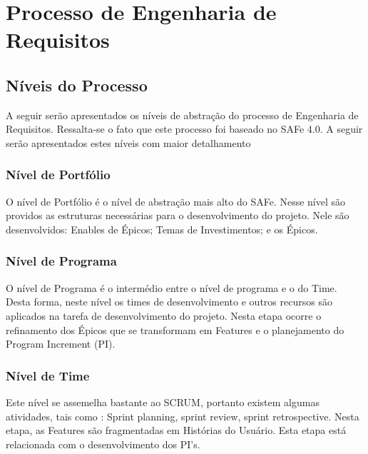 
\chapter[Processo de Engenharia de Requisitos]{Processo de Engenharia de Requisitos}

{
	\large{\section {Níveis do Processo\\} }

	\tab A seguir serão apresentados os níveis de abstração do processo de Engenharia de Requisitos. Ressalta-se o fato que este processo foi baseado no SAFe 4.0. A seguir serão apresentados estes níveis com maior detalhamento\\

}

{
	\large{\subsection {Nível de Portfólio\\} }

	\tab O nível de Portfólio é o nível de abstração mais alto do SAFe. Nesse nível são providos as estruturas necessárias para o desenvolvimento do projeto.  Nele são desenvolvidos: Enables de Épicos; Temas de Investimentos; e os Épicos. \\

}


{
	 \large{\subsection {Nível de Programa\\} }

	 \tab O nível de Programa é o intermédio entre o nível de programa e o do Time. Desta forma, neste nível os times de desenvolvimento e outros recursos são aplicados na tarefa de desenvolvimento do projeto.  Nesta etapa ocorre o refinamento dos Épicos que se transformam em Features e o planejamento do Program Increment (PI).\\
}

{
	\large{\subsection {Nível de Time\\} }

	\tab Este nível se assemelha bastante ao SCRUM,  portanto existem algumas atividades, tais como : Sprint planning, sprint review, sprint retrospective. Nesta etapa, as Features são fragmentadas em Histórias do Usuário. Esta etapa está relacionada com o desenvolvimento dos PI’s. \\
}

